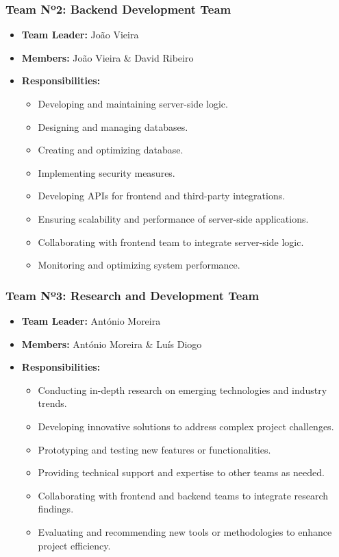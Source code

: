 \subsubsection{Team Nº2: Backend Development Team}
\begin{itemize}
    \item \textbf{Team Leader:} João Vieira 
    \item \textbf{Members:} João Vieira \& David Ribeiro
    \item \textbf{Responsibilities:}
    \begin{itemize}
        \item Developing and maintaining server-side logic.
        \item Designing and managing databases.
        \item Creating and optimizing database.
        \item Implementing security measures.
        \item Developing APIs for frontend and third-party integrations.
        \item Ensuring scalability and performance of server-side applications.
        \item Collaborating with frontend team to integrate server-side logic.
        \item Monitoring and optimizing system performance.
    \end{itemize}
\end{itemize}

\subsubsection{Team Nº3: Research and Development Team}
\begin{itemize}
    \item \textbf{Team Leader:} António Moreira 
    \item \textbf{Members:} António Moreira \& Luís Diogo
    \item \textbf{Responsibilities:}
    \begin{itemize}
        \item Conducting in-depth research on emerging technologies and industry trends.
        \item Developing innovative solutions to address complex project challenges.
        \item Prototyping and testing new features or functionalities.
        \item Providing technical support and expertise to other teams as needed.
        \item Collaborating with frontend and backend teams to integrate research findings.
        \item Evaluating and recommending new tools or methodologies to enhance project efficiency.
    \end{itemize}
\end{itemize}

